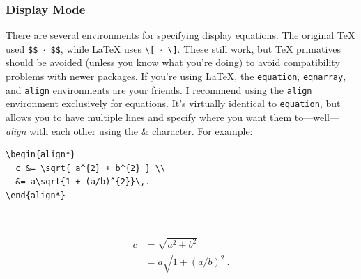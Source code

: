 \subsubsection{Display Mode}
There are several environments for specifying display equations.
The original \TeX{} used \texttt{\$\$\,$\cdot$\,\$\$}, while \LaTeX{} uses \texttt{\textbackslash [\,$\cdot$\,\textbackslash ]}.
These still work, but \TeX{} primatives should be avoided (unless you know what you're doing) to avoid compatibility problems with newer packages.
If you're using \LaTeX{}, the \texttt{equation}, \texttt{eqnarray}, and \texttt{align} environments are your friends.
I recommend using the \texttt{align} environment exclusively for equations. 
It's virtually identical to \texttt{equation}, but allows you to have multiple lines and specify where you want them to---well---\emph{align} with each other using the \& character.
For example:
\begin{center}
\begin{minipage}{0.45\textwidth}
\vspace{2mm}
\small
\begin{verbatim}
\begin{align*}
  c &= \sqrt{ a^{2} + b^{2} } \\
  &= a\sqrt{1 + (a/b)^{2}}\,.
\end{align*}
\end{verbatim}
\end{minipage}~%
\begin{minipage}{0.45\textwidth}
\vspace{2mm}
\small
\begin{align*}
  c &= \sqrt{ a^{2} + b^{2} } \\
  &= a\sqrt{1 + (a/b)^{2}}\,.
\end{align*}
\end{minipage}
\end{center}


